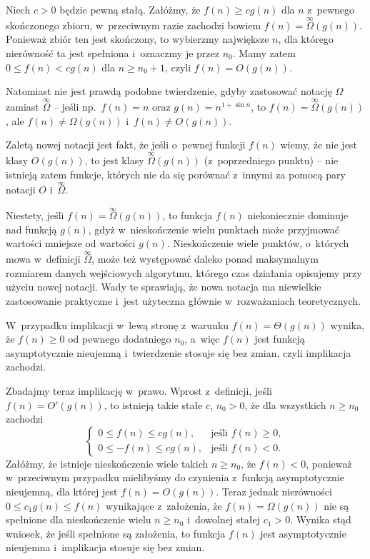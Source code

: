 \subproblem %
Niech $c>0$ będzie pewną stałą.
Załóżmy, że $f(n)\ge cg(n)$ dla $n$ z~pewnego skończonego zbioru, w~przeciwnym razie zachodzi bowiem $f(n)=\overset{\infty}{\Omega}(g(n))$.
Ponieważ zbiór ten jest skończony, to wybierzmy największe $n$, dla którego nierówność ta jest spełniona i~oznaczmy je przez $n_0$.
Mamy zatem $0\le f(n)<cg(n)$ dla $n\ge n_0+1$, czyli $f(n)=O(g(n))$.

Natomiast nie jest prawdą podobne twierdzenie, gdyby zastosować notację $\Omega$ zamiast $\overset{\infty}{\Omega}$ -- jeśli np.\ $f(n)=n$ oraz $g(n)=n^{1+\sin n}$, to $f(n)=\overset{\infty}{\Omega}(g(n))$, ale $f(n)\ne\Omega(g(n))$ i~$f(n)\ne O(g(n))$.

\subproblem %
Zaletą nowej notacji jest fakt, że jeśli o~pewnej funkcji $f(n)$ wiemy, że nie jest klasy $O(g(n))$, to jest klasy $\overset{\infty}{\Omega}(g(n))$ (z~poprzedniego punktu) -- nie istnieją zatem funkcje, których nie da się porównać z~innymi za pomocą pary notacji $O$ i~$\overset{\infty}{\Omega}$.

Niestety, jeśli $f(n)=\overset{\infty}{\Omega}(g(n))$, to funkcja $f(n)$ niekoniecznie dominuje nad funkcją $g(n)$, gdyż w~nieskończenie wielu punktach może przyjmować wartości mniejsze od wartości $g(n)$.
Nieskończenie wiele punktów, o~których mowa w~definicji $\overset{\infty}{\Omega}$, może też występować daleko ponad maksymalnym rozmiarem danych wejściowych algorytmu, którego czas działania opisujemy przy użyciu nowej notacji.
Wady te sprawiają, że nowa notacja ma niewielkie zastosowanie praktyczne i~jest użyteczna głównie w~rozważaniach teoretycznych.

\subproblem %
W~przypadku implikacji w~lewą stronę z~warunku $f(n)=\Theta(g(n))$ wynika, że $f(n)\ge0$ od pewnego dodatniego $n_0$, a~więc $f(n)$ jest funkcją asymptotycznie nieujemną i~twierdzenie stosuje się bez zmian, czyli implikacja zachodzi.

Zbadajmy teraz implikację w~prawo.
Wprost z~definicji, jeśli $f(n)=O'(g(n))$, to istnieją takie stałe $c$, $n_0>0$, że dla wszystkich $n\ge n_0$ zachodzi
\[
	\begin{cases}
		0 \le f(n) \le cg(n), & \text{jeśli $f(n)\ge0$}, \\
		0 \le -f(n) \le cg(n), & \text{jeśli $f(n)<0$}.
	\end{cases}
\]
Załóżmy, że istnieje nieskończenie wiele takich $n\ge n_0$, że $f(n)<0$, ponieważ w~przeciwnym przypadku mielibyśmy do czynienia z~funkcją asymptotycznie nieujemną, dla której jest $f(n)=O(g(n))$.
Teraz jednak nierówności $0\le c_1g(n)\le f(n)$ wynikające z~założenia, że $f(n)=\Omega(g(n))$ nie są spełnione dla nieskończenie wielu $n\ge n_0$ i~dowolnej stałej $c_1>0$.
Wynika stąd wniosek, że jeśli spełnione są założenia, to funkcja $f(n)$ jest asymptotycznie nieujemna i~implikacja stosuje się bez zmian.

